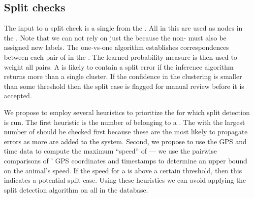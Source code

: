     \subsection{Split checks}
        The input to a split check is a single \name{} from the
          \masterdatabase{}.
        All \annots{} in this \name{} are used as nodes in the \idengraph{}.
        Note that we can not rely on just the \exemplars{} because the
          non-\exemplar{} \annots{} must also be assigned new \name{} labels.
        The one-vs-one algorithm establishes correspondences between each pair
          of \annots{} in the \name{}.
        The learned probability measure is then used to weight all pairs.
        A \name{} is likely to contain a split error if the inference
          algorithm returns more than a single cluster.
        If the confidence in the clustering is smaller than some threshold
          then the split case is flagged for manual review before it is
          accepted.

        We propose to employ several heuristics to prioritize the \names{} for
          which split detection is run.
        The first heuristic is the number of \annots{} belonging to a \name{}.
        The \names{} with the largest number of \annots{} should be checked
          first because these \names{} are the most likely to propagate errors
          as more \annots{} are added to the system.
        Second, we propose to use the GPS and time data to compute the maximum
          ``speed'' of \aan{\name{}} --- \ie{} we use the pairwise comparisons
          of \annots{}' GPS coordinates and timestamps to determine an upper
          bound on the animal's speed.
        If the speed for a \name{} is above a certain threshold, then this
          indicates a potential split case.
        Using these heuristics we can avoid applying the split detection
          algorithm on all \names{} in the database.


